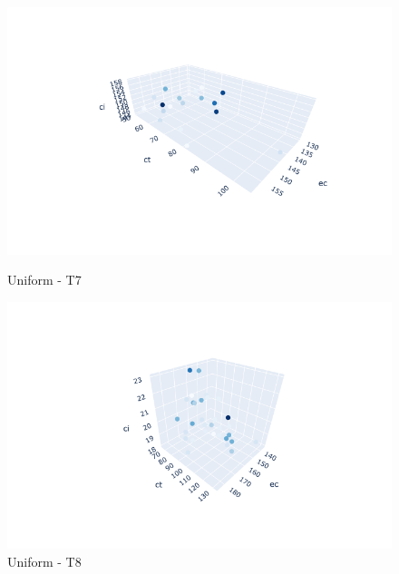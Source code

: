 \documentclass{hust}
\begin{document}
\begin{itemize}
	\begin{figure}[H]
		\begin{minipage}{0.5\textwidth}
			\centering
			\includegraphics[width=1.2\linewidth]{images/uu-dem7.png}
			\caption{Uniform - T7}\label{fig:nsga-ii-uu-dem7}
		\end{minipage}\hfill
		\begin{minipage}{0.5\textwidth}
			\centering
			\includegraphics[width=1.2\linewidth]{images/uu-dem8.png}
			\caption{Uniform - T8}\label{fig:nsga-ii-uu-dem8}
		\end{minipage}
	\end{figure}
	

\end{itemize}
\end{document}
